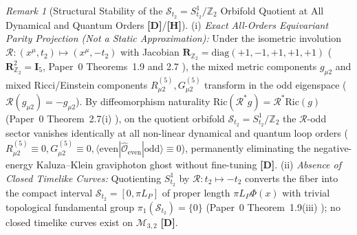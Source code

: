 \documentclass[11pt,a4paper]{article}
\newcommand{\catD}{\textbf{\textcolor{blue!75!black}{[D]}}}
\newcommand{\catH}{\textbf{\textcolor{orange!85!black}{[H]}}}
\theoremstyle{definition}
\theoremstyle{remark}
\newtheorem{remark}[theorem]{Remark}
\begin{document}
\begin{remark}[Structural Stability of the $\mathcal{S}_{t_2} = S^1_{t_2}/\mathbb{Z}_2$ Orbifold Quotient at All Dynamical and Quantum Orders \catD/\catH]
\label{rem:orbifold_consequences}
(i) \emph{Exact All-Orders Equivariant Parity Projection (Not a Static Approximation):} Under the isometric involution $\mathcal{R}: (x^\mu, t_2) \mapsto (x^\mu, -t_2)$ with Jacobian $\mathbf{R}_{\mathbb{Z}_2} = \text{diag}(+1, -1, +1, +1, +1)$ ($\mathbf{R}_{\mathbb{Z}_2}^2 = \mathbf{I}_5$, Paper~0 Theorems~1.9 and 2.7 \cite{JV_Paper0}), the mixed metric components $g_{\mu 2}$ and mixed Ricci/Einstein components $R_{\mu 2}^{(5)}, G_{\mu 2}^{(5)}$ transform in the odd eigenspace ($\mathcal{R}(g_{\mu 2}) = -g_{\mu 2}$). By diffeomorphism naturality $\text{Ric}(\mathcal{R}^* g) = \mathcal{R}^*\text{Ric}(g)$ (Paper~0 Theorem~2.7(i) \cite{JV_Paper0}), on the quotient orbifold $\mathcal{S}_{t_2} = S^1_{t_2}/\mathbb{Z}_2$ the $\mathcal{R}$-odd sector vanishes identically at all non-linear dynamical and quantum loop orders ($R_{\mu 2}^{(5)} \equiv 0, G_{\mu 2}^{(5)} \equiv 0, \langle\text{even}|\hat{\mathcal{O}}_{\text{even}}|\text{odd}\rangle \equiv 0$), permanently eliminating the negative-energy Kaluza--Klein graviphoton ghost without fine-tuning \catD.
(ii) \emph{Absence of Closed Timelike Curves:} Quotienting $S^1_{t_2}$ by $\mathcal{R}: t_2 \mapsto -t_2$ converts the fiber into the compact interval $\mathcal{S}_{t_2} = [0, \pi L_P]$ of proper length $\pi L_P\Phi(x)$ with trivial topological fundamental group $\pi_1(\mathcal{S}_{t_2}) = \{0\}$ (Paper~0 Theorem~1.9(iii) \cite{JV_Paper0}); no closed timelike curves exist on $\mathcal{M}_{3,2}$ \catD.

\end{remark}
\end{document}
